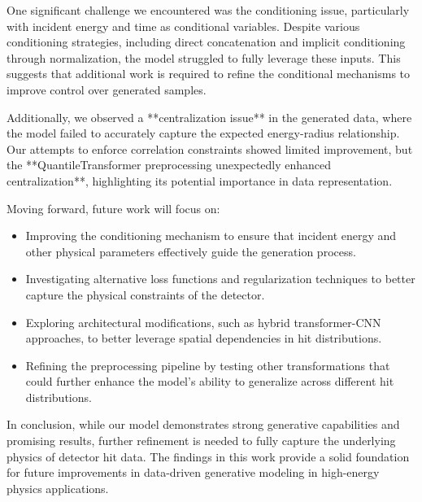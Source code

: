 One significant challenge we encountered was the conditioning issue, particularly with incident energy and time as conditional variables. Despite various conditioning strategies, including direct concatenation and implicit conditioning through normalization, the model struggled to fully leverage these inputs. This suggests that additional work is required to refine the conditional mechanisms to improve control over generated samples.

Additionally, we observed a **centralization issue** in the generated data, where the model failed to accurately capture the expected energy-radius relationship. Our attempts to enforce correlation constraints showed limited improvement, but the **QuantileTransformer preprocessing unexpectedly enhanced centralization**, highlighting its potential importance in data representation.

Moving forward, future work will focus on:
\begin{itemize}
    \item Improving the conditioning mechanism to ensure that incident energy and other physical parameters effectively guide the generation process.
    \item Investigating alternative loss functions and regularization techniques to better capture the physical constraints of the detector.
    \item Exploring architectural modifications, such as hybrid transformer-CNN approaches, to better leverage spatial dependencies in hit distributions.
    \item Refining the preprocessing pipeline by testing other transformations that could further enhance the model's ability to generalize across different hit distributions.
\end{itemize}

In conclusion, while our model demonstrates strong generative capabilities and promising results, further refinement is needed to fully capture the underlying physics of detector hit data. The findings in this work provide a solid foundation for future improvements in data-driven generative modeling in high-energy physics applications.




